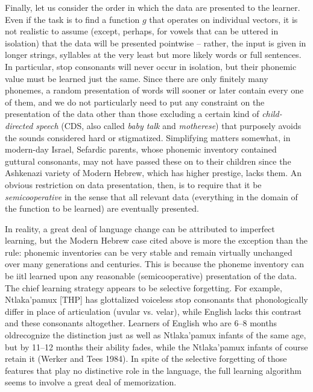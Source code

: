Finally, let us consider the order in which the data are presented to the
learner. Even if the task is to find a function $g$ that operates on
individual vectors, it is not realistic to assume (except, perhaps, for vowels
that can be uttered in isolation) that the data will be presented pointwise --
rather, the input is given in longer strings, syllables at the very least but
more likely words or full sentences. In particular, stop consonants will never
occur in isolation, but their phonemic value must be learned just the same.
Since there are only finitely many phonemes, a random presentation of words
will sooner or later contain every one of them, and we do not particularly
need to put any constraint on the presentation of the data other than those
excluding a certain kind of {\it child-directed speech} (CDS, also called {\it baby
  talk} and {\it motherese}) that purposely avoids the sounds considered hard
or stigmatized. Simplifying matters somewhat, in modern-day Israel, Sefardic
parents, whose phonemic inventory contained guttural consonants, may not have
passed these on to their children since the Ashkenazi variety of Modern
Hebrew, which has higher prestige, lacks them. An obvious restriction on data
presentation, then, is to require that it be {\it semicooperative} in the
sense that all relevant data (everything in the domain of the function to be
learned) are eventually presented.

In reality, a great deal of language change can be attributed to imperfect
learning, but the Modern Hebrew case cited above is more the exception than
the rule: phonemic inventories can be very stable and remain virtually
unchanged over many generations and centuries.  This is because the phoneme
inventory can be iitl learned upon any reasonable (semicooperative)
presentation of the data. The chief learning strategy appears to be selective
forgetting. For example, Ntlaka'pamux [THP] has
glottalized voiceless stop consonants that phonologically differ in place of
articulation (uvular vs. velar), while English lacks this contrast and these
consonants altogether. Learners of English who are 6--8 months oldrecognize
the distinction just as well as Ntlaka'pamux infants of the same age, but by
11--12 months their ability fades, while the Ntlaka'pamux infants of course
retain it (Werker and Tees 1984).\nocite{Werker:1984} In spite of the
selective forgetting of those features that play no distinctive role in the
language, the full learning algorithm seems to involve a great deal of
memorization.

